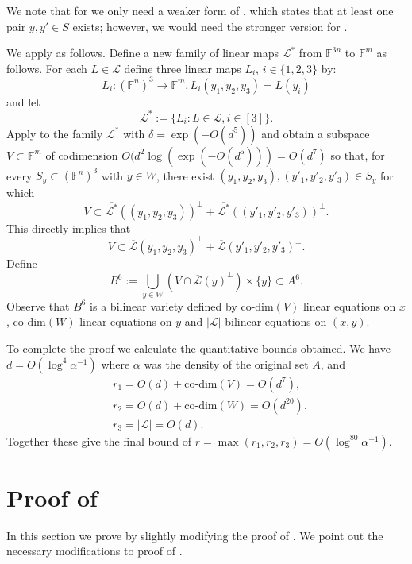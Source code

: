 \documentclass[12pt]{article}
\newcommand{\F}{\mathbb{F}}
\newcommand{\hr}{\textup{h}}
\newcommand{\vr}{\textup{v}}
\newcommand{\LL}{\mathcal{L}}
\newcommand{\eps}{\varepsilon}
\newcommand{\codim}{\text{co-dim}}
\begin{document}
We note that for  we only need a weaker form of , which states that at least one pair $y,y' \in S$ exists; however, we would need the stronger version for .

We apply  as follows. Define a new family of linear maps $\LL^*$ from $\F^{3n}$ to $\F^m$
as follows.
	For each $L \in \LL$ define three linear maps $L_i$, $i\in\{1,2,3\}$ by:
$$L_i:(\F^{n})^3\rightarrow\F^{m}, L_i(y_1,y_2,y_3) = L(y_i)$$
	and let $$\LL^* := \{L_i : L\in \LL, i\in [3]\}.$$
	Apply  to the family $\LL^*$ with $\delta  = \exp(-O(d^5))$ and obtain a subspace $V\subset \F^m$ of codimension $O(d^2\log(\exp(-O(d^5)))=O(d^7)$ so that, for every $S_y\subset (\F^n)^3$ with $y\in W$, there exist $(y_1,y_2,y_3),(y'_1,y'_2,y'_3)\in S_y$ for which
$$V\subset  \overline{\LL^*}((y_1,y_2,y_3))^\perp + \overline{\LL^*}((y'_1,y'_2,y'_3))^\perp.$$
This directly implies that
$$V\subset  \overline{\LL}(y_1,y_2,y_3)^\perp + \overline{\LL}(y'_1,y'_2,y'_3) ^\perp.$$
Define
$$
B^6:= \bigcup_{y\in W}\left( V \cap {\overline{\LL}(y)}^\perp \right) \times \{y\} \subset A^6.
$$
Observe that $B^6$ is a bilinear variety defined by $\codim(V)$ linear equations on $x$, $\codim(W)$ linear equations on $y$
and $|\LL|$ bilinear equations on $(x,y)$.

To complete the proof we calculate the quantitative bounds obtained. We have $d = O(\log^4 \alpha^{-1})$ where $\alpha$ was the density of the original set $A$, and
\begin{align*}
&r_1 = O(d)+ \codim(V) = O(d^7),\\
&r_2 = O(d) + \codim(W) = O(d^{20}),\\
&r_3 = |\LL| = O(d).
\end{align*}
Together these give the final bound of $r = \max(r_1,r_2,r_3) = O(\log^{80}\alpha^{-1})$.


\section{Proof of }\label{section:main2}

In this section we prove  by slightly modifying the proof of .
We point out the necessary modifications to proof of .
\end{document}
